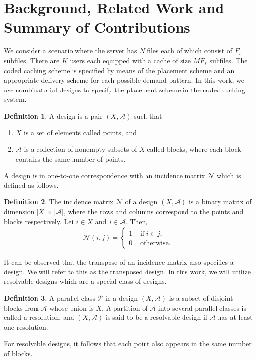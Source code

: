 \documentclass[journal,twocolumn]{IEEEtran}
\theoremstyle{definition}
\newtheorem{definition}{Definition}
\newcommand{\calA}{\mathcal{A}}
\newcommand{\calN}{\mathcal{N}}
\newcommand{\calP}{\mathcal{P}}
\begin{document}
\section{Background, Related Work and Summary of Contributions}
\label{sec:background}
We consider a scenario where the server has $N$ files each of which consist of $F_s$ subfiles. There are $K$ users each equipped with a cache of size $MF_s$ subfiles. The coded caching scheme is specified by means of the placement scheme and an appropriate delivery scheme for each possible demand pattern. In this work, we use combinatorial designs \cite{Stinson} to specify the placement scheme in the coded caching system.	
\begin{definition}
\label{def:comb_design}
A design is a pair $(X, \calA)$ such that
\begin{enumerate}
\item  $X$ is a set of elements called points, and
\item $\calA$ is a collection of nonempty subsets of $X$ called blocks, where each block contains the same number of points.
\end{enumerate}
\end{definition}
A design is in one-to-one correspondence with an incidence matrix $\calN$ which is defined as follows.
\begin{definition}
	The incidence matrix $\calN$ of a design $(X, \calA)$ is a binary matrix of dimension $|X| \times |\calA|$, where the rows and columns correspond to the points and blocks respectively.
	Let $i \in X$ and $j \in \calA$. Then,
	\begin{align*}
		\calN (i,j) = \begin{cases}
			1 & \text{~if $i \in j$,}\\
			0 & \text{~otherwise}.
		\end{cases}
	\end{align*}
\end{definition}
It can be observed that the transpose of an incidence matrix also specifies a design. We will refer to this as the transposed design. In this work, we will utilize resolvable designs which are a special class of designs.
\begin{definition}
\label{def:resolv_design}
A parallel class $\calP$ in a design $(X,\calA)$ is a subset of disjoint blocks from $\calA$ whose union is $X$. A partition of $\calA$ into several parallel classes is called a resolution, and $(X,\calA)$ is said to be a resolvable design if $\calA$ has at least one resolution.
\end{definition}
For resolvable designs, it follows that each point also appears in the same number of blocks.
\end{document}
